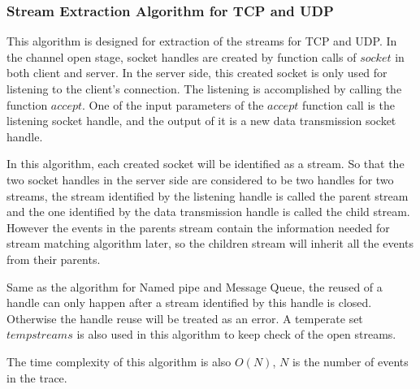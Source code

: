 \subsubsection{Stream Extraction Algorithm for TCP and UDP}
This algorithm is designed for extraction of the streams for TCP and UDP. In the channel open stage, socket handles are created by function calls of $socket$ in both client and server. In the server side, this created socket is only used for listening to the client's connection. The listening is accomplished by calling the function $accept$. One of the input parameters of the $accept$ function call is the listening socket handle, and the output of it is a new data transmission socket handle. 


In this algorithm, each created socket will be identified as a stream. So that the two socket handles in the server side are considered to be two handles for two streams, the stream identified by the listening handle is called the parent stream and the one identified by the data transmission handle is called the child stream. However the events in the parents stream contain the information needed for stream matching algorithm later, so the children stream will inherit all the events from their parents. 

Same as the algorithm for Named pipe and Message Queue, the reused of a handle can only happen after a stream identified by this handle is closed. Otherwise the handle reuse will be treated as an error. A temperate set $tempstreams$ is also used in this algorithm to keep check of the open streams.

The time complexity of this algorithm is also $O(N)$, $N$ is the number of events in the trace.

